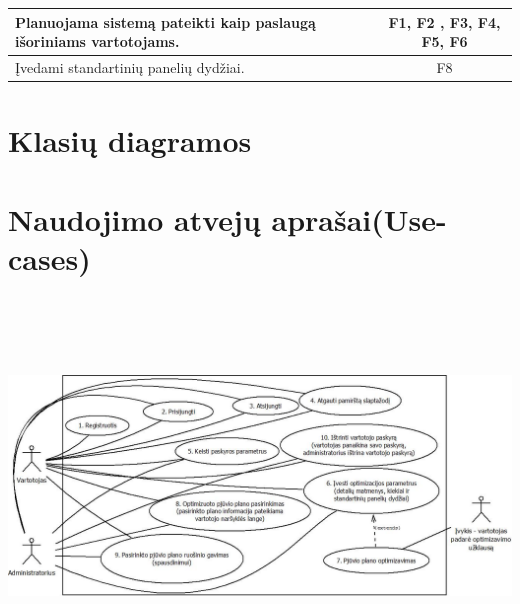\documentclass[a4paper,12pt]{article}
\begin{document}
\begin{frame}
\begin{tabular}{|l|c|}
Planuojama sistemą pateikti kaip paslaugą išoriniams vartotojams.                                                                                                                                                                                                                                                                                         												& F1, F2	, F3, F4, F5, F6		\\ \hline

Įvedami standartinių panelių dydžiai.			& F8							\\ \hline

\end{tabular}
\end{frame}


\section{Klasių diagramos}

\section{Naudojimo atvejų aprašai(Use-cases)}

\includegraphics[width=18cm, height=10cm]{diagrama}
\end{document}

